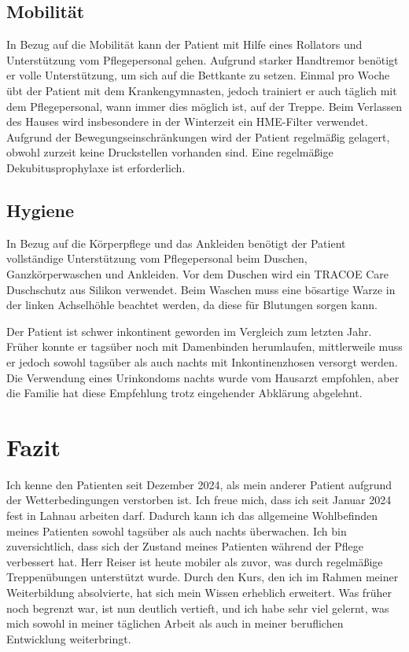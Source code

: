 \documentclass[a4paper,12pt]{article}
\begin{document}
\subsection{Mobilität}
In Bezug auf die Mobilität kann der Patient mit Hilfe eines Rollators und Unterstützung vom
Pflegepersonal gehen. Aufgrund starker Handtremor benötigt er volle Unterstützung, um sich auf
die Bettkante zu setzen. Einmal pro Woche übt der Patient mit dem Krankengymnasten, jedoch trainiert
er auch täglich mit dem Pflegepersonal, wann immer dies möglich ist, auf der Treppe. Beim Verlassen
des Hauses wird insbesondere in der Winterzeit ein HME-Filter verwendet. Aufgrund der Bewegungseinschränkungen
wird der Patient regelmäßig gelagert, obwohl zurzeit keine Druckstellen vorhanden sind. Eine regelmäßige
Dekubitusprophylaxe ist erforderlich.

\subsection{Hygiene}
In Bezug auf die Körperpflege und das Ankleiden benötigt der Patient vollständige Unterstützung vom
Pflegepersonal beim Duschen, Ganzkörperwaschen und Ankleiden. Vor dem Duschen wird ein TRACOE Care
Duschschutz aus Silikon verwendet. Beim Waschen muss eine bösartige Warze in der linken Achselhöhle
beachtet werden, da diese für Blutungen sorgen kann.

Der Patient ist schwer inkontinent geworden im Vergleich zum letzten Jahr. Früher konnte er tagsüber
noch mit Damenbinden herumlaufen, mittlerweile muss er jedoch sowohl tagsüber als auch nachts mit
Inkontinenzhosen versorgt werden. Die Verwendung eines Urinkondoms nachts wurde vom Hausarzt empfohlen,
aber die Familie hat diese Empfehlung trotz eingehender Abklärung abgelehnt.

\section{Fazit}
Ich kenne den Patienten seit Dezember 2024, als mein anderer Patient aufgrund der Wetterbedingungen
verstorben ist. Ich freue mich, dass ich seit Januar 2024 fest in Lahnau arbeiten darf. Dadurch kann
ich das allgemeine Wohlbefinden meines Patienten sowohl tagsüber als auch nachts überwachen. Ich bin
zuversichtlich, dass sich der Zustand meines Patienten während der Pflege verbessert hat. Herr Reiser
ist heute mobiler als zuvor, was durch regelmäßige Treppenübungen unterstützt wurde.
Durch den Kurs, den ich im Rahmen meiner Weiterbildung absolvierte, hat sich mein Wissen erheblich erweitert.
Was früher noch begrenzt war, ist nun deutlich vertieft,
und ich habe sehr viel gelernt,
was mich sowohl in meiner täglichen Arbeit als auch in meiner beruflichen Entwicklung weiterbringt.


\end{document}
